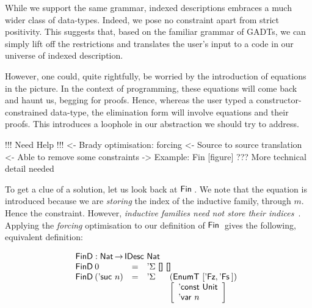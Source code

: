 While we support the same grammar, indexed descriptions embraces a
much wider class of data-types. Indeed, we pose no constraint apart
from strict positivity. This suggests that, based on the familiar
grammar of GADTs, we can simply lift off the restrictions and
translates the user's input to a code in our universe of indexed
description. 

However, one could, quite rightfully, be worried by the introduction
of equations in the picture. In the context of programming, these
equations will come back and haunt us, begging for proofs. Hence,
whereas the user typed a constructor-constrained data-type, the
elimination form will involve equations and their proofs. This
introduces a loophole in our abstraction we should try to address.


\begin{wstructure}
!!! Need Help !!!
<- Brady optimisation: forcing
    <- Source to source translation
    <- Able to remove some constraints
    -> Example: Fin [figure]
    ??? More technical detail needed
\end{wstructure}

To get a clue of a solution, let us look back at $\Fin$. We note that
the equation is introduced because we are \emph{storing} the index of
the inductive family, through $m$. Hence the constraint. However,
\emph{inductive families need not store their
  indices}~\cite{brady:index-inductive-families}. Applying the
\emph{forcing} optimisation to our definition of $\Fin$ gives the
following, equivalent definition:


\[\stk{
\FinD : \Nat \To \IDesc{\Nat} \\
\begin{array}{@{}llll}
\FinD\: 0            & = & \multicolumn{2}{l}{\DSigma{\Void}{\Void} } \\
\FinD\: (\NatSuc{n}) & = & \DSigma{}{} & (\EnumT [ \FinZero , \FinSuc{} ]) \\
                     &   &             & \left[
                                         \begin{array}{l}
                                         \DConst{\Unit} \\
                                         \DVar{n}
                                         \end{array}
                                         \right]
\end{array}
}\]

